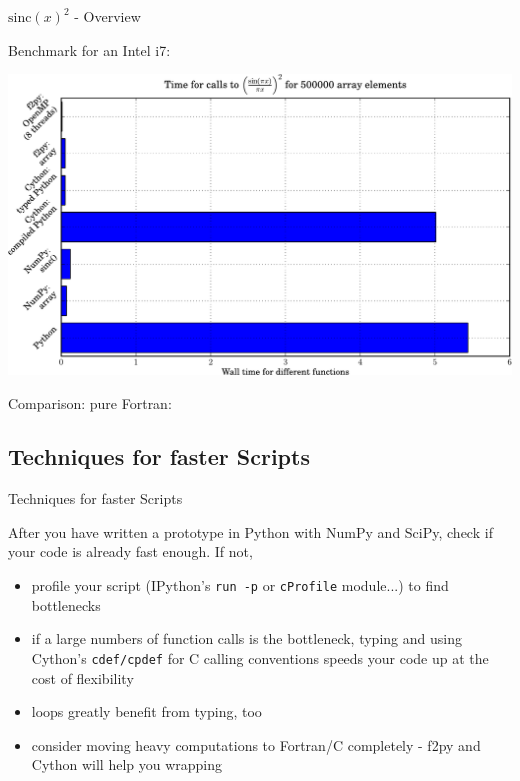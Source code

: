 \begin{frame}{$\mathrm{sinc}(x)^{2}$ - Overview}

Benchmark for an Intel i7:

\begin{center}
    \includegraphics[width=1.0\textwidth]{Figures/benchmark}
\end{center}

Comparison: pure Fortran: 

\end{frame}

\subsection{Techniques for faster Scripts}

\begin{frame}{Techniques for faster Scripts}

After you have written a prototype in Python with NumPy and SciPy,
check if your code is already fast enough. If not,

\begin{itemize}
    \item profile your script (IPython's {\texttt{run -p}} or
    {\texttt{cProfile}} module...) to find bottlenecks
    \item if a large numbers of function calls is the bottleneck,
    typing and using  Cython's {\texttt{cdef/cpdef}} for C calling
    conventions speeds your code up at the cost of flexibility
    \item loops greatly benefit from typing, too
    \item consider moving heavy computations to Fortran/C completely -
    f2py and Cython will help you wrapping
\end{itemize}

\end{frame}

